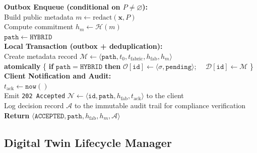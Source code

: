 \documentclass[final,5p,times,twocolumn]{elsarticle}
\begin{document}
\begin{algorithm}[!htbp]
{}
\BlankLine
\textbf{Outbox Enqueue (conditional on $P\neq\varnothing$):} \\
 {
    Build public metadata $m \leftarrow \mathrm{redact}(\mathbf{x}, P)$ \\
    Compute commitment $h_m \leftarrow \mathcal{H}(m)$ \\
    $\texttt{path} \leftarrow \mathtt{HYBRID}$ \\
}
\BlankLine
\textbf{Local Transaction (outbox + deduplication):} \\
Create metadata record $\mathcal{M} \leftarrow \langle\texttt{path}, t_0, t_{\text{fabric}}, h_{\mathrm{fab}}, h_m\rangle$ \\
\textbf{atomically} \{ \textbf{if} $\texttt{path}=\mathtt{HYBRID}$ \textbf{then} $\mathcal{O}[\texttt{id}] \leftarrow \langle\sigma,\mathtt{pending}\rangle$; \ \ $\mathcal{D}[\texttt{id}] \leftarrow \mathcal{M}$ \} \\
\BlankLine
\textbf{Client Notification and Audit:} \\
$t_{\text{ack}} \leftarrow \mathtt{now}()$ \\
Emit \texttt{202 Accepted} $\mathcal{N} \leftarrow \langle \texttt{id}, \texttt{path}, h_{\mathrm{fab}}, t_{\text{ack}}\rangle$ to the client \\
Log decision record $\mathcal{A}$ to the immutable audit trail for compliance verification \\
\BlankLine
{}
\BlankLine
\textbf{Return} $\langle\mathtt{ACCEPTED}, \texttt{path}, h_{\mathrm{fab}}, h_m, \mathcal{A}\rangle$ \\
\end{algorithm}

\subsection{\textbf{Digital Twin Lifecycle Manager}}
\label{sec:digital_twin}
\end{document}
